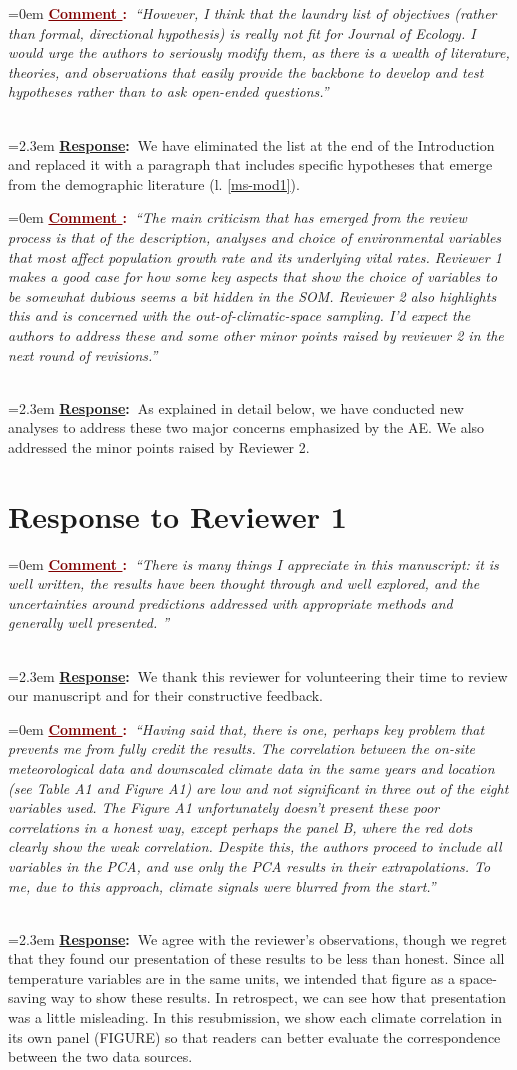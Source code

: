 \documentclass[12pt]{article}
\newcounter{cN}
\newcommand{\comment}[1]{
	\vspace{2em}
	\refstepcounter{cN} %
	\noindent \hangindent=0em \textbf{\textcolor{Maroon}{\uline{Comment \thecN}:~}}\emph{``#1''}
	}
\newcommand{\response}[1]{
	\\[0.25em]
	\hangindent=2.3em \textbf{\textcolor{NavyBlue}{\uline{Response}:~}}#1
	}
\begin{document}
\comment{However, I think that the laundry list of objectives (rather than formal, directional hypothesis) is really not fit for Journal of Ecology. I would urge the authors to seriously modify them, as there is a wealth of literature, theories, and observations that easily provide the backbone to develop and test hypotheses rather than to ask open-ended questions.}
\response{We have eliminated the list at the end of the Introduction and replaced it with a paragraph that includes specific hypotheses that emerge from the demographic literature (l. \ref{ms-mod1}).}

\comment{The main criticism that has emerged from the review process is that of the description, analyses and choice of environmental variables that most affect population growth rate and its underlying vital rates. Reviewer 1 makes a good case for how some key aspects that show the choice of variables to be somewhat dubious seems a bit hidden in the SOM. Reviewer 2 also highlights this and is concerned with the out-of-climatic-space sampling. I'd expect the authors to address these and some other minor points raised by reviewer 2 in the next round of revisions.}
\response{As explained in detail below, we have conducted new analyses to address these two major concerns emphasized by the AE.
We also addressed the minor points raised by Reviewer 2.
}

\section{Response to Reviewer 1}
\vspace{-2em}

\comment{There is many things I appreciate in this manuscript: it is well written, the results have been thought through and well explored, and the uncertainties around predictions addressed with appropriate methods and generally well presented. }
\response{We thank this reviewer for volunteering their time to review our manuscript and for their constructive feedback.}

\comment{Having said that, there is one, perhaps key problem that prevents me from fully credit the results. The correlation between the on-site meteorological data and downscaled climate data in the same years and location (see Table A1 and Figure A1) are low and not significant in three out of the eight variables used. The Figure A1 unfortunately doesn't present these poor correlations in a honest way, except perhaps the panel B, where the red dots clearly show the weak correlation. Despite this, the authors proceed to include all variables in the PCA, and use only the PCA results in their extrapolations. To me, due to this approach, climate signals were blurred from the start.}
\response{We agree with the reviewer's observations, though we regret that they found our presentation of these results to be less than honest.
Since all temperature variables are in the same units, we intended that figure as a space-saving way to show these results.
In retrospect, we can see how that presentation was a little misleading. 
In this resubmission, we show each climate correlation in its own panel (FIGURE) so that readers can better evaluate the correspondence between the two data sources. }
\end{document}
